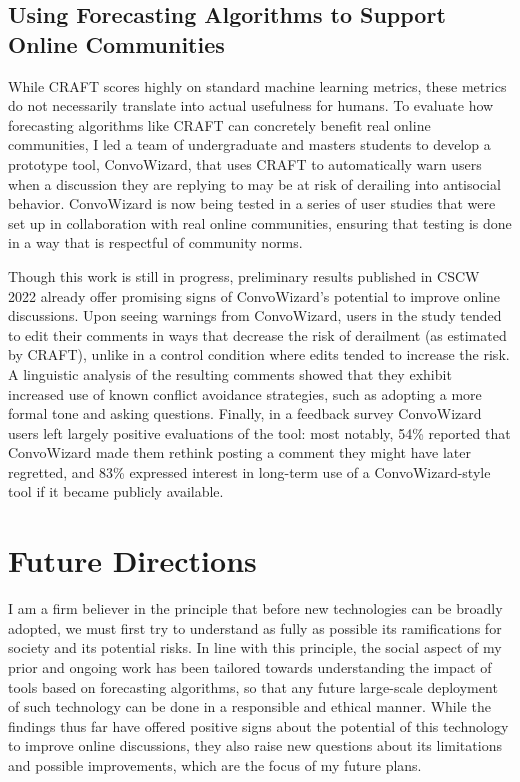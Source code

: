 \documentclass[12pt,letterpaper]{article}
\begin{document}
\subsection{Using Forecasting Algorithms to Support Online Communities}
While CRAFT scores highly on standard machine learning metrics, these metrics do not necessarily translate into actual usefulness for humans.
To evaluate how forecasting algorithms like CRAFT can concretely benefit real online communities, I led a team of undergraduate and masters students to develop a prototype tool, ConvoWizard, that uses CRAFT to automatically warn users when a discussion they are replying to may be at risk of derailing into antisocial behavior.
ConvoWizard is now being tested in a series of user studies that were set up in collaboration with real online communities, ensuring that testing is done in a way that is respectful of community norms.

Though this work is still in progress, preliminary results published in CSCW 2022 \cite{chang_thread_2022} already offer promising signs of ConvoWizard's potential to improve online discussions.
Upon seeing warnings from ConvoWizard, users in the study tended to edit their comments in ways that decrease the risk of derailment (as estimated by CRAFT), unlike in a control condition where edits tended to increase the risk.
A linguistic analysis of the resulting comments showed that they exhibit increased use of known conflict avoidance strategies, such as adopting a more formal tone and asking questions.
Finally, in a feedback survey ConvoWizard users left largely positive evaluations of the tool: most notably, 54\% reported that ConvoWizard made them rethink posting a comment they might have later regretted, and 83\% expressed interest in long-term use of a ConvoWizard-style tool if it became publicly available.

\section{Future Directions}
I am a firm believer in the principle that before new technologies can be broadly adopted, we must first try to understand as fully as possible its ramifications for society and its potential risks.
In line with this principle, the social aspect of my prior and ongoing work has been tailored towards understanding the impact of tools based on forecasting algorithms, so that any future large-scale deployment of such technology can be done in a responsible and ethical manner.
While the findings thus far have offered positive signs about the potential of this technology to improve online discussions, they also raise new questions about its limitations and possible improvements, which are the focus of my future plans.
\end{document}
